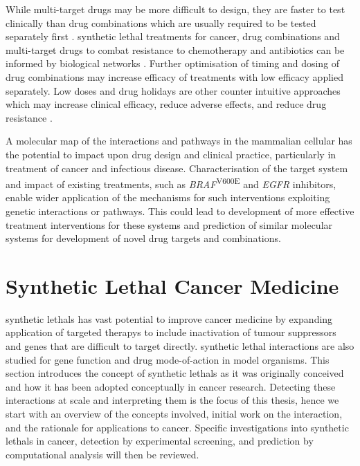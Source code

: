 While multi-target drugs may be more difficult to design, they are faster to test clinically than drug combinations which are usually required to be tested separately first \citep{Hopkins2008}. \Gls{synthetic lethal} \glspl{treatment} for cancer, drug combinations and multi-target drugs to combat resistance to \gls{chemotherapy} and antibiotics can be informed by biological networks \citep{Hopkins2008, Barabasi2004}. Further optimisation of timing and dosing of drug combinations may increase efficacy of \glspl{treatment} with low efficacy applied separately. Low doses and drug holidays are other counter intuitive approaches which may increase clinical efficacy, reduce adverse effects, and reduce drug resistance \citep{Sun2014, Tsai2012}.  

A molecular map of the interactions and \glspl{pathway} in the mammalian cellular  has the potential to impact upon drug design and clinical practice, particularly in treatment of cancer and infectious disease. Characterisation of the target system and impact of existing \glspl{treatment}, such as  \textit{BRAF}\textsuperscript{V600E} and \textit{EGFR} inhibitors, enable wider application of the mechanisms for such interventions exploiting genetic interactions or \glspl{pathway}. This could lead to development of more effective treatment interventions for these systems and prediction of similar molecular systems for development of novel drug targets and combinations.  
\fi


\section{Synthetic Lethal Cancer Medicine}

\Glspl{synthetic lethal} has vast potential to improve cancer medicine by expanding application of \glspl{targeted therapy} to include inactivation of \glspl{tumour suppressor} and genes that are difficult to target directly. \Gls{synthetic lethal} interactions are also studied for gene function and drug mode-of-action in model organisms. This section introduces the concept of \glspl{synthetic lethal} as it was originally conceived and how it has been adopted conceptually in cancer research. Detecting these interactions at scale and interpreting them is the focus of this thesis, hence we start with an overview of the concepts involved, initial work on the interaction, and the rationale for applications to cancer. Specific investigations into \glspl{synthetic lethal} in cancer, detection by experimental screening, and prediction by computational analysis will then be reviewed.


